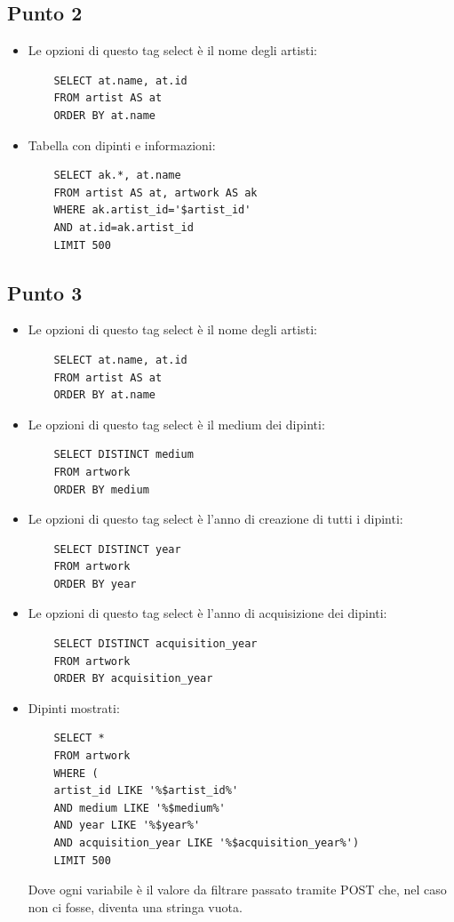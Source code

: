 \documentclass{ol-softwaremanual}
\begin{document}
\subsection{Punto 2}
\begin{itemize}
    \item Le opzioni di questo tag select è il nome degli artisti:
    \begin{verbatim}
    SELECT at.name, at.id 
    FROM artist AS at 
    ORDER BY at.name
    \end{verbatim}
    \item Tabella con dipinti e informazioni:
    \begin{verbatim}
    SELECT ak.*, at.name 
    FROM artist AS at, artwork AS ak
    WHERE ak.artist_id='$artist_id'
    AND at.id=ak.artist_id
    LIMIT 500
    \end{verbatim}
\end{itemize}

\subsection{Punto 3}
\begin{itemize}
    \item Le opzioni di questo tag select è il nome degli artisti:
    \begin{verbatim}
    SELECT at.name, at.id
    FROM artist AS at
    ORDER BY at.name
    \end{verbatim}
    \item Le opzioni di questo tag select è il medium dei dipinti:
    \begin{verbatim}
    SELECT DISTINCT medium 
    FROM artwork
    ORDER BY medium
    \end{verbatim}
    \item Le opzioni di questo tag select è l'anno di creazione di tutti i dipinti:
    \begin{verbatim}
    SELECT DISTINCT year 
    FROM artwork
    ORDER BY year
    \end{verbatim}
    \item Le opzioni di questo tag select è l'anno di acquisizione dei dipinti:
    \begin{verbatim}
    SELECT DISTINCT acquisition_year 
    FROM artwork
    ORDER BY acquisition_year
    \end{verbatim}
    \item Dipinti mostrati:
    \begin{verbatim}
    SELECT *
    FROM artwork
    WHERE (
    artist_id LIKE '%$artist_id%' 
    AND medium LIKE '%$medium%'
    AND year LIKE '%$year%'
    AND acquisition_year LIKE '%$acquisition_year%')
    LIMIT 500
    \end{verbatim}
    Dove ogni variabile è il valore da filtrare passato tramite POST che, nel caso non ci fosse, diventa una stringa vuota.
\end{itemize}
\end{document}
